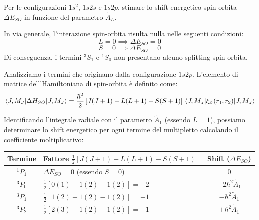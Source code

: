 \begin{exercise}
\begin{solution}
\end{solution}

\end{exercise}

\begin{exercise}

Per le configurazioni \( 1s^2 \), \( 1s 2s \) e \( 1s 2p \), stimare lo shift energetico spin-orbita \( \Delta E_{SO} \) in funzione del parametro \( \tilde{A}_L \).
\begin{solution}
In via generale, l'interazione spin-orbita risulta nulla nelle seguenti condizioni:
\begin{equation}
    L = 0 \implies \Delta E_{SO} = 0
\end{equation}
\begin{equation}
    S = 0 \implies \Delta E_{SO} = 0
\end{equation}
Di conseguenza, i termini \( ^3S_1 \) e \( ^1S_0 \) non presentano alcuno splitting spin-orbita.

Analizziamo i termini che originano dalla configurazione \( 1s 2p \). L'elemento di matrice dell'Hamiltoniana di spin-orbita è definito come:
\begin{equation}
    \mel{J, M_J}{\Delta H_{SO}}{J, M_J} = \frac{\hbar^2}{2} \left[ J(J+1) - L(L+1) - S(S+1) \right] \mel{J, M_J}{\xi_Z(r_1, r_2)}{J, M_J}
\end{equation}

Identificando l'integrale radiale con il parametro \( \tilde{A}_1 \) (essendo \( L=1 \)), possiamo determinare lo shift energetico per ogni termine del multipletto calcolando il coefficiente moltiplicativo:

\begin{table}[htbp]
    \centering
    \renewcommand{\arraystretch}{1.5}
    \begin{tabular}{|c|l|c|}
        \hline
        \textbf{Termine} & \textbf{Fattore} \( \frac{1}{2} \left[ J(J+1) - L(L+1) - S(S+1) \right] \) & \textbf{Shift} (\( \Delta E_{SO} \)) \\
        \hline
        \( ^1P_1 \) & \( \Delta E_{SO} = 0 \) (essendo \( S=0 \)) & \( 0 \) \\
        \hline
        \( ^3P_0 \) & \( \frac{1}{2} [0(1) - 1(2) - 1(2)] = -2 \) & \( -2\hbar^2\tilde{A}_1 \) \\
        \hline
        \( ^3P_1 \) & \( \frac{1}{2} [1(2) - 1(2) - 1(2)] = -1 \) & \( -\hbar^2\tilde{A}_1 \) \\
        \hline
        \( ^3P_2 \) & \( \frac{1}{2} [2(3) - 1(2) - 1(2)] = +1 \) & \( +\hbar^2\tilde{A}_1 \) \\
        \hline
    \end{tabular}
\end{table}


\end{solution}
\end{exercise}
